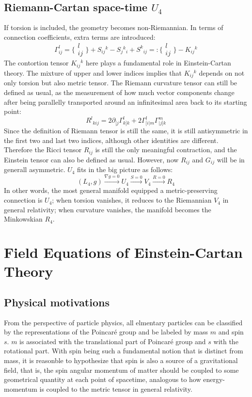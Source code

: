 \documentclass[12pt]{article}
\begin{document}
\subsection{Riemann-Cartan space-time $U_4$}
If torsion is included, the geometry becomes non-Riemannian. In terms of connection coefficients, extra terms are introduced:
\[ \Gamma^l_{ij} = \{\substack{l\\ij}\} + S_{ij}{}^k - S_j{}^k{}_i + S^k{}_{ij} =: \{\substack{l\\ij}\} - K_{ij}{}^k \]
The contortion tensor $K_{ij}{}^k$ here plays a fundamental role in Einstein-Cartan theory. The mixture of upper and lower indices implies that $K_{ij}{}^k$ depends on not only torsion but also metric tensor. The Riemann curvature tensor can still be defined as usual, as the measurement of how much vector components change after being parallelly transported around an infinitesimal area back to its starting point:
\[ R^l{}_{kij} = 2\partial_{[j}\Gamma^l_{k]k} + 2\Gamma^l_{[i|m}\Gamma^m_{|j]k} \] 
Since the definition of Riemann tensor is still the same, it is still antisymmetric in the first two and last two indices, although other identities are different. Therefore the Ricci tensor $R_{ij}$ is still the only meaningful contraction, and the Einstein tensor can also be defined as usual. However, now $R_{ij}$ and $G_{ij}$ will be in generall asymmetric. $U_4$ fits in the big picture as follows:
\[ (L_4, g) \xrightarrow{\nabla g = 0} U_4 \xrightarrow{S=0} V_4 \xrightarrow{R = 0} R_4\]
In other words, the most general manifold equipped a metric-preserving connection is $U_4$; when torsion vanishes, it reduces to the Riemannian $V_4$ in general relativity; when curvature vanishes, the manifold becomes the Minkowskian $R_4$.
\section{Field Equations of Einstein-Cartan Theory}
\subsection{Physical motivations}
From the perspective of particle physics, all elmentary particles can be classified by the representations of the Poincar\'e group and be labeled by mass $m$ and spin $s$. $m$ is associated with the translational part of Poincar\'e group and $s$ with the rotational part. With spin being such a fundamental notion that is distinct from mass, it is reasonble to hypothesize that spin is also a source of a gravitational field, that is, the spin angular momentum of matter should be coupled to some geometrical quantity at each point of spacetime, analogous to how energy-momentum is coupled to the metric tensor in general relativity. 
\end{document}
